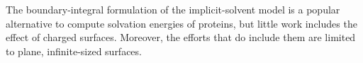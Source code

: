 The boundary-integral formulation of the implicit-solvent model is a popular alternative to compute solvation energies of proteins,\cite{YoonLenhoff1990, Juffer1991a, LuETal2006, BajajETal2011, AltmanBardhanWhiteTidor09, GengKrasny2013, CooperBardhanBarba2013} but little work includes the effect of charged surfaces. Moreover, the efforts that do include them\cite{YoonLenhoff1992} are limited to plane, infinite-sized surfaces. 


 \begin{comment}
 
Figure \ref{fig:molecule_surface_stern} shows a more interesting situation. There, the surface $\Gamma_3$ has a given potential $\phi_0$ with a Stern layer, and interacts with a molecule that has a pocket of solvent, where the linearized Poisson-Boltzmann equation is enforced. In this case, the derivation that led to Equation \eqref{eq:matrix_phi} yields
 
 \newpage
 

\end{comment}
